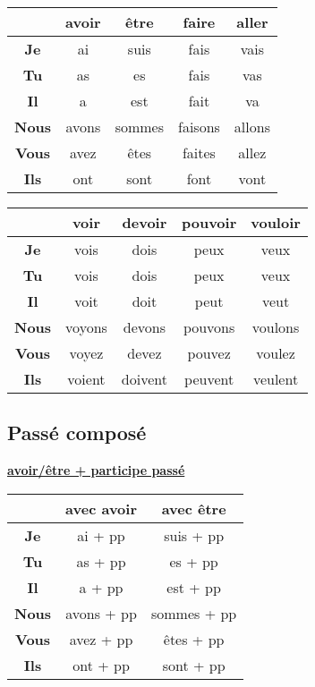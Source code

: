 \documentclass[12pt, a4paper]{article}
\begin{document}
\begin{multicols*}{3}
\begin{center}
\begin{tabular}{|c|c|c|c|c|}
  \hline
  & \textbf{avoir} & \textbf{être} & \textbf{faire} & \textbf{aller}\\\hline
  \textbf{Je} & ai & suis & fais & vais\\\hline
  \textbf{Tu} & as & es & fais & vas\\\hline
  \textbf{Il} & a & est & fait & va\\\hline
  \textbf{Nous} & avons & sommes & faisons & allons\\\hline
  \textbf{Vous} & avez & êtes & faites & allez \\\hline
  \textbf{Ils} & ont & sont & font & vont \\\hline
\end{tabular}
\end{center}
\begin{center}
\begin{tabular}{|c|c|c|c|c|}
  \hline
  & \textbf{voir} & \textbf{devoir} & \textbf{pouvoir} & \textbf{vouloir}\\\hline
  \textbf{Je} & vois & dois & peux & veux\\\hline
  \textbf{Tu} & vois & dois & peux & veux\\\hline
  \textbf{Il} & voit & doit & peut & veut\\\hline
  \textbf{Nous} & voyons & devons & pouvons & voulons\\\hline
  \textbf{Vous} & voyez & devez & pouvez & voulez \\\hline
  \textbf{Ils} & voient & doivent & peuvent & veulent \\\hline
\end{tabular}
\end{center}
\colbreak

\subsection{Passé composé}

\begin{center}
\underline{\textbf{avoir/être + participe passé}}
\begin{tabular}{|c|c|c|}
  \hline
  & \textbf{avec avoir} & \textbf{avec être}\\\hline
  \textbf{Je} & ai + pp & suis + pp \\\hline
  \textbf{Tu} & as + pp & es + pp \\\hline
  \textbf{Il} & a + pp & est + pp \\\hline
  \textbf{Nous} & avons + pp & sommes + pp \\\hline
  \textbf{Vous} & avez + pp & êtes + pp \\\hline
  \textbf{Ils} & ont + pp & sont + pp \\\hline
\end{tabular}
\end{center}


\end{multicols*}
\end{document}

